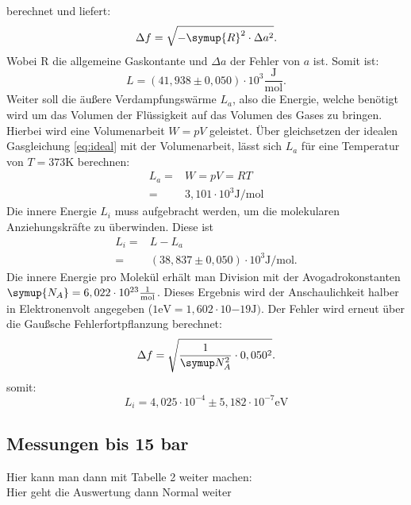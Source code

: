 berechnet und liefert:
\begin{equation}
  \Delta f = \sqrt{-\symup{R}^2 \cdot \Delta a^2}.
\end{equation}
Wobei R die allgemeine Gaskontante und $\Delta a$ der Fehler von $a$ ist.
Somit ist:
\begin{equation*}
  L=(41,938 \pm 0,050)\cdot 10^3 \frac{\si{\joule}}{\si{\mol}}.
\end{equation*}
\newpage
Weiter soll die äußere Verdampfungswärme $L_a$, also die Energie, welche
benötigt wird um das Volumen der Flüssigkeit auf das Volumen des Gases
zu bringen. Hierbei wird eine Volumenarbeit $W=pV$ geleistet.
Über gleichsetzen der idealen Gasgleichung \eqref{eq:ideal} mit der
Volumenarbeit, lässt sich $L_a$ für eine Temperatur von $T=373 \si{\kelvin}$
berechnen:
\begin{align*}
  L_a =& W =pV=RT \\
      =& 3,101 \cdot 10^3 \si{\joule \per \mol}
\end{align*}
Die innere Energie $L_i$ muss aufgebracht werden, um die molekularen
Anziehungskräfte zu überwinden. Diese ist
\begin{align*}
  L_i=&L-L_a \\
  =& (38,837 \pm 0,050)\cdot 10^3 \si{\joule\per\mol}.
\end{align*}
 Die innere Energie pro Molekül erhält man Division mit der Avogadrokonstanten
 $\symup{N_A}=6,022 \cdot 10^{23} \frac{1}{\si{\mol}}$.
 Dieses Ergebnis wird der Anschaulichkeit halber in Elektronenvolt angegeben
 ($1\si{\electronvolt}=1,602\cdot 10{{-19}}\si{\joule})$.
 Der Fehler wird erneut über die Gaußsche Fehlerfortpflanzung berechnet:
 \begin{equation*}
   \Delta f=\sqrt{\frac{1}{\symup N_A^2}\cdot 0,050^2}.
 \end{equation*}
 somit:
 \begin{equation*}
   L_i=4,025\cdot 10^{-4} \pm 5,182\cdot 10^{-7}\si{\electronvolt}
 \end{equation*}
\subsection{Messungen bis 15 bar}
Hier kann man dann mit Tabelle 2 weiter machen:
 \\
Hier geht die Auswertung dann Normal weiter
